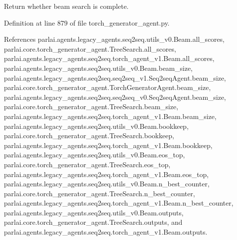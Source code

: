 \begin{DoxyVerb}Return whether beam search is complete.\end{DoxyVerb}
 

Definition at line 879 of file torch\+\_\+generator\+\_\+agent.\+py.



References parlai.\+agents.\+legacy\+\_\+agents.\+seq2seq.\+utils\+\_\+v0.\+Beam.\+all\+\_\+scores, parlai.\+core.\+torch\+\_\+generator\+\_\+agent.\+Tree\+Search.\+all\+\_\+scores, parlai.\+agents.\+legacy\+\_\+agents.\+seq2seq.\+torch\+\_\+agent\+\_\+v1.\+Beam.\+all\+\_\+scores, parlai.\+agents.\+legacy\+\_\+agents.\+seq2seq.\+utils\+\_\+v0.\+Beam.\+beam\+\_\+size, parlai.\+agents.\+legacy\+\_\+agents.\+seq2seq.\+seq2seq\+\_\+v1.\+Seq2seq\+Agent.\+beam\+\_\+size, parlai.\+core.\+torch\+\_\+generator\+\_\+agent.\+Torch\+Generator\+Agent.\+beam\+\_\+size, parlai.\+agents.\+legacy\+\_\+agents.\+seq2seq.\+seq2seq\+\_\+v0.\+Seq2seq\+Agent.\+beam\+\_\+size, parlai.\+core.\+torch\+\_\+generator\+\_\+agent.\+Tree\+Search.\+beam\+\_\+size, parlai.\+agents.\+legacy\+\_\+agents.\+seq2seq.\+torch\+\_\+agent\+\_\+v1.\+Beam.\+beam\+\_\+size, parlai.\+agents.\+legacy\+\_\+agents.\+seq2seq.\+utils\+\_\+v0.\+Beam.\+bookkeep, parlai.\+core.\+torch\+\_\+generator\+\_\+agent.\+Tree\+Search.\+bookkeep, parlai.\+agents.\+legacy\+\_\+agents.\+seq2seq.\+torch\+\_\+agent\+\_\+v1.\+Beam.\+bookkeep, parlai.\+agents.\+legacy\+\_\+agents.\+seq2seq.\+utils\+\_\+v0.\+Beam.\+eos\+\_\+top, parlai.\+core.\+torch\+\_\+generator\+\_\+agent.\+Tree\+Search.\+eos\+\_\+top, parlai.\+agents.\+legacy\+\_\+agents.\+seq2seq.\+torch\+\_\+agent\+\_\+v1.\+Beam.\+eos\+\_\+top, parlai.\+agents.\+legacy\+\_\+agents.\+seq2seq.\+utils\+\_\+v0.\+Beam.\+n\+\_\+best\+\_\+counter, parlai.\+core.\+torch\+\_\+generator\+\_\+agent.\+Tree\+Search.\+n\+\_\+best\+\_\+counter, parlai.\+agents.\+legacy\+\_\+agents.\+seq2seq.\+torch\+\_\+agent\+\_\+v1.\+Beam.\+n\+\_\+best\+\_\+counter, parlai.\+agents.\+legacy\+\_\+agents.\+seq2seq.\+utils\+\_\+v0.\+Beam.\+outputs, parlai.\+core.\+torch\+\_\+generator\+\_\+agent.\+Tree\+Search.\+outputs, and parlai.\+agents.\+legacy\+\_\+agents.\+seq2seq.\+torch\+\_\+agent\+\_\+v1.\+Beam.\+outputs.

\mbox{\label{classparlai_1_1core_1_1torch__generator__agent_1_1TreeSearch_a004609539d0428a9351a991168eb370b}} 

